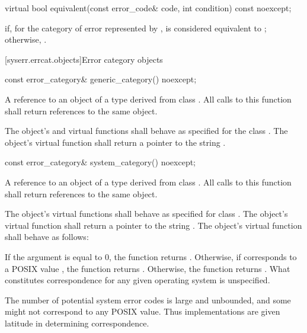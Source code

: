 %
\begin{itemdecl}
virtual bool equivalent(const error_code& code, int condition) const noexcept;
\end{itemdecl}

\begin{itemdescr}
\pnum
\returns
{} if, for the category of error represented by ,  is considered equivalent to ; otherwise, .
\end{itemdescr}

[syserr.errcat.objects]{Error category objects}

%
\begin{itemdecl}
const error_category& generic_category() noexcept;
\end{itemdecl}

\begin{itemdescr}
\pnum
\returns
A reference to an object of a type derived from class .
All calls to this function shall return references to the same object.

\pnum
\remarks
The object's  and  virtual functions shall behave as specified for the class . The object's  virtual function shall return a pointer to the string .
\end{itemdescr}

%
\begin{itemdecl}
const error_category& system_category() noexcept;
\end{itemdecl}

\begin{itemdescr}
\pnum
\returns
A reference to an object of a type derived from class .
All calls to this function shall return references to the same object.

\pnum
\remarks
The object's  virtual functions shall behave as specified for
class . The object's  virtual function shall return a
pointer to the string . The object's 
virtual function shall behave as follows:

If the argument  is equal to 0,
the function returns .
Otherwise,
if  corresponds to a POSIX  value ,
the function returns .
Otherwise, the function returns .
What constitutes correspondence for any given operating system is unspecified.
\begin{note}
The number of potential system error codes is large
and unbounded, and some might not correspond to any POSIX  value. Thus
implementations are given latitude in determining correspondence.
\end{note}
\end{itemdescr}

